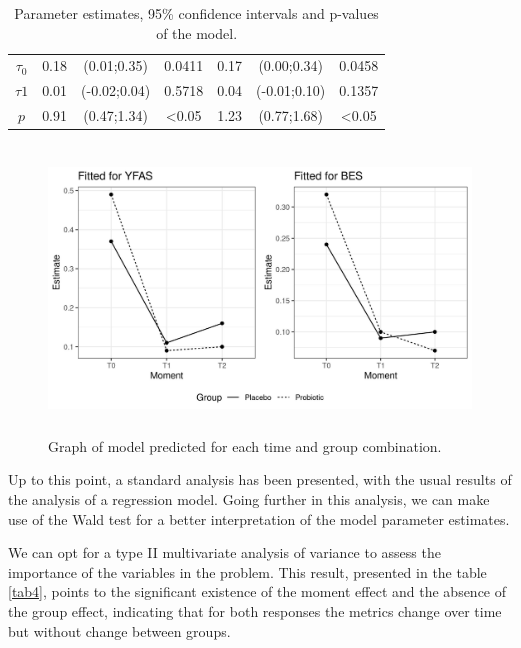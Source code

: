 \documentclass[Review,sagev,times, doublespace]{sagej}
\begin{document}
\begin{table}[h]
\begin{tabular}{c|cccccc}
$\tau_0$                   & 0.18       & (0.01;0.35)                                                       & \multicolumn{1}{c|}{0.0411} & 0.17       & (0.00;0.34)                                                       & 0.0458           \\
$\tau1$                    & 0.01       & (-0.02;0.04)                                                      & \multicolumn{1}{c|}{0.5718}           & 0.04       & (-0.01;0.10)                                                      & 0.1357           \\
$p$                        & 0.91       & (0.47;1.34)                                                       & \multicolumn{1}{c|}{\textless 0.05} & 1.23       & (0.77;1.68)                                                       & \textless 0.05 \\ \hline
\end{tabular}
\caption{Parameter estimates, 95\% confidence intervals and p-values of the model.}
\label{tab3}
\end{table}

\begin{figure}[h]
\centering
\includegraphics[width=31.5pc,height=18pc]{FIGURE6.jpeg}
\caption{Graph of model predicted for each time and group combination.\label{fig6}}
\end{figure}


  
Up to this point, a standard analysis has been presented, with the usual results of the analysis of a regression model. Going further in this analysis, we can make use of the Wald test for a better interpretation of the model parameter estimates.

We can opt for a type II multivariate analysis of variance to assess the importance of the variables in the problem. This result, presented in the table \autoref{tab4}, points to the significant existence of the moment effect and the absence of the group effect, indicating that for both responses the metrics change over time but without change between groups.
\end{document}
